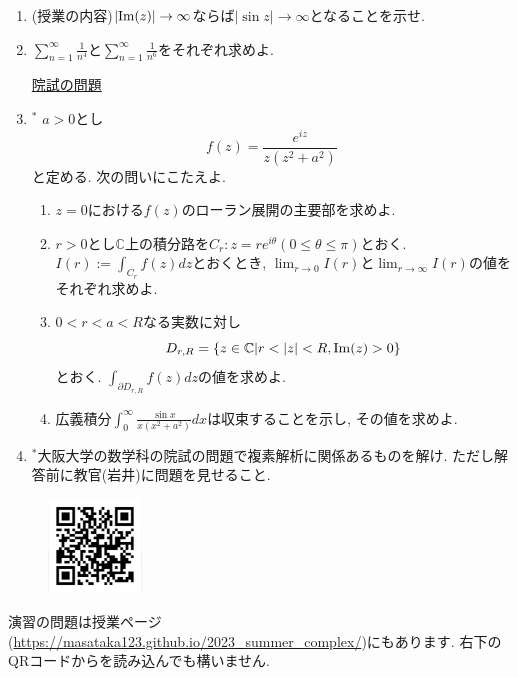 \documentclass[dvipdfmx,a4paper,11pt]{article}
\newcommand{\C}{\mathbb{C}}
\theoremstyle{definition}
\begin{document}
\begin{enumerate}[label=\textbf{問}4.\arabic*]
 \item  (授業の内容)$|{ \rm Im}(z)| \rightarrow \infty$ならば$|\sin z| \rightarrow \infty$となることを示せ.
 
 
\item $\sum_{n=1}^{\infty}\frac{1}{n^4}$と$\sum_{n=1}^{\infty}\frac{1}{n^6}$をそれぞれ求めよ. 

   
 
\vspace{12pt}
\hspace{-36pt}\underline{院試の問題}  
  \item $^{*}$ $a>0$とし
  $$
  f(z) = \frac{ e^{iz}}{z(z^2 + a^2)}
  $$
  と定める. 次の問いにこたえよ.
   \begin{enumerate}
 \setlength{\parskip}{0cm} 
  \setlength{\itemsep}{0cm} 
  \item $z=0$における$f(z)$のローラン展開の主要部を求めよ.
  \item $r>0$とし$\C$上の積分路を$C_{r} : z = r e^{i \theta} (0 \le \theta \le \pi)$とおく. 
  $I(r) := \int_{C_r} f(z )dz$とおくとき, $\lim_{r \rightarrow 0} I(r)$と$\lim_{r \rightarrow \infty} I(r)$の値をそれぞれ求めよ.
  \item $0 < r < a < R$なる実数に対し
  $$
  D_{r,R}= \{ z \in \C | r < |z| < R, {\rm Im}(z) >0 \}
  $$
  とおく. $\int_{\partial D_{r,R}} f(z) dz$の値を求めよ.
  \item 広義積分$\int_{0}^{\infty}\frac{ \sin x}{x(x^2 + a^2)} dx$は収束することを示し, その値を求めよ.
      \end{enumerate}
     
\item $^{*}$大阪大学の数学科の院試の問題で複素解析に関係あるものを解け. ただし解答前に教官(岩井)に問題を見せること. 

    \end{enumerate}      
 

 
 \vspace{11pt}\begin{figure}  \centering\includegraphics[height=25mm, width=25mm]{complex.png}\end{figure}

演習の問題は授業ページ(\url{https://masataka123.github.io/2023_summer_complex/})にもあります. 右下のQRコードからを読み込んでも構いません.


  
  
 
\end{document}
